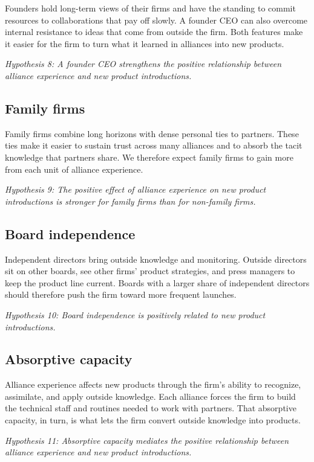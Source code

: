 \documentclass[12pt]{article}
\begin{document}
Founders hold long-term views of their firms and have the standing to commit resources to collaborations that pay off slowly. A founder CEO can also overcome internal resistance to ideas that come from outside the firm. Both features make it easier for the firm to turn what it learned in alliances into new products.

\textit{Hypothesis 8: A founder CEO strengthens the positive relationship between alliance experience and new product introductions.}

\subsection{Family firms}

Family firms combine long horizons with dense personal ties to partners. These ties make it easier to sustain trust across many alliances and to absorb the tacit knowledge that partners share. We therefore expect family firms to gain more from each unit of alliance experience.

\textit{Hypothesis 9: The positive effect of alliance experience on new product introductions is stronger for family firms than for non-family firms.}

\subsection{Board independence}

Independent directors bring outside knowledge and monitoring. Outside directors sit on other boards, see other firms' product strategies, and press managers to keep the product line current. Boards with a larger share of independent directors should therefore push the firm toward more frequent launches.

\textit{Hypothesis 10: Board independence is positively related to new product introductions.}

\subsection{Absorptive capacity}

Alliance experience affects new products through the firm's ability to recognize, assimilate, and apply outside knowledge. Each alliance forces the firm to build the technical staff and routines needed to work with partners. That absorptive capacity, in turn, is what lets the firm convert outside knowledge into products.

\textit{Hypothesis 11: Absorptive capacity mediates the positive relationship between alliance experience and new product introductions.}
\end{document}
